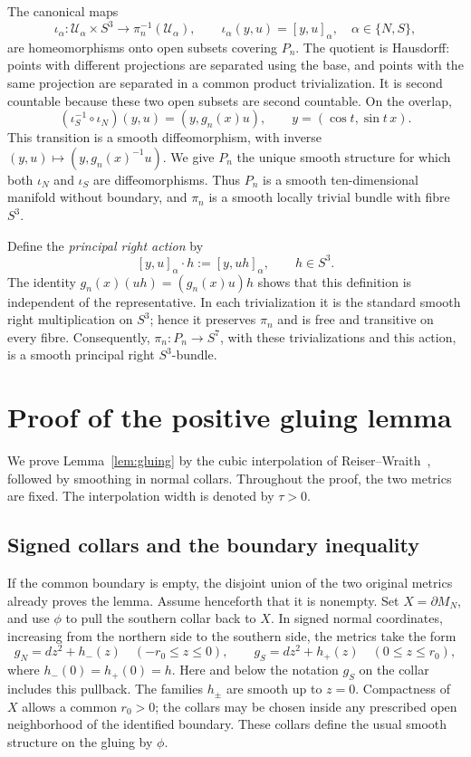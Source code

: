 \documentclass[12pt]{amsart}
\numberwithin{equation}{section}
\theoremstyle{remark}
\begin{document}
The canonical maps
\[
 \iota_\alpha:\mathcal U_\alpha\times S^3
       \longrightarrow\pi_n^{-1}(\mathcal U_\alpha),\qquad
 \iota_\alpha(y,u)=[y,u]_\alpha,
 \quad \alpha\in\{N,S\},
\]
are homeomorphisms onto open subsets covering \(P_n\).
The quotient is Hausdorff: points with different projections are
separated using the base, and points with the same projection are
separated in a common product trivialization. It is second countable
because these two open subsets are second countable. On the overlap,
\[
 (\iota_S^{-1}\circ\iota_N)(y,u)
       =(y,g_n(x)u),\qquad y=(\cos t,\sin t\,x).
\]
This transition is a smooth diffeomorphism, with inverse
\((y,u)\mapsto(y,g_n(x)^{-1}u)\). We give \(P_n\) the unique smooth
structure for which both \(\iota_N\) and \(\iota_S\) are
diffeomorphisms. Thus \(P_n\) is a smooth ten-dimensional manifold
without boundary, and \(\pi_n\) is a smooth locally trivial bundle
with fibre \(S^3\).

Define the \emph{principal right action} by
\[
 [y,u]_\alpha\cdot h:=[y,uh]_\alpha,\qquad h\in S^3.
\]
The identity \(g_n(x)(uh)=(g_n(x)u)h\) shows that this definition
is independent of the representative. In each trivialization it is
the standard smooth right multiplication on \(S^3\); hence it
preserves \(\pi_n\) and is free and transitive on every fibre.
Consequently, \(\pi_n:P_n\to S^7\), with these trivializations and
this action, is a smooth principal right \(S^3\)-bundle.

\section{Proof of the positive gluing lemma}\label{app:gluing}

We prove Lemma~\ref{lem:gluing} by the cubic interpolation of
Reiser--Wraith~\cite[Section~2]{RW}, followed by smoothing in normal
collars. Throughout the proof, the two metrics are fixed. The
interpolation width is denoted by \(\tau>0\).

\subsection{Signed collars and the boundary inequality}
If the common boundary is empty, the disjoint union of the two
original metrics already proves the lemma. Assume henceforth
that it is nonempty. Set \(X=\partial M_N\), and use \(\phi\) to pull the southern
collar back to \(X\). In signed normal coordinates, increasing
from the northern side to the southern side, the metrics take
the form
\begin{equation}\label{eq:glue-collars}
 g_N=dz^2+h_-(z)\quad(-r_0\le z\le0),\qquad
 g_S=dz^2+h_+(z)\quad(0\le z\le r_0),
\end{equation}
where \(h_-(0)=h_+(0)=h\). Here and below the notation \(g_S\)
on the collar includes this pullback. The families \(h_\pm\) are
smooth up to \(z=0\). Compactness of \(X\) allows a common
\(r_0>0\); the collars may be chosen inside any prescribed open
neighborhood of the identified boundary. These collars define the
usual smooth structure on the gluing by \(\phi\).
\end{document}
